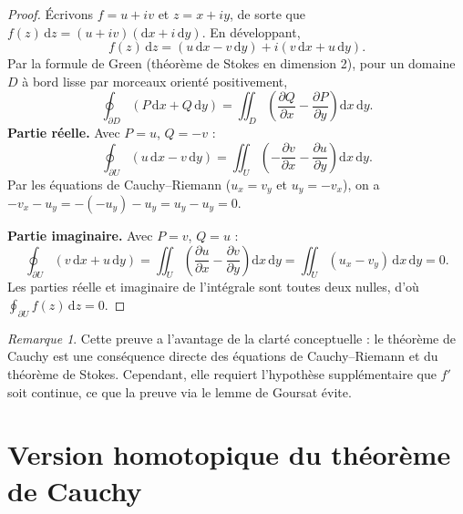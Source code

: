 \documentclass[12pt,a4paper,openany]{book}
\theoremstyle{definition}
\theoremstyle{plain}
\theoremstyle{remark}
\newtheorem{remarque}[definition]{Remarque}
\newcommand{\dd}{\mathrm{d}}
\begin{document}
\begin{proof}
Écrivons $f = u + iv$ et $z = x + iy$, de sorte que
$f(z)\,\dd z = (u+iv)(\dd x + i\,\dd y)$. En développant,
\[
  f(z)\,\dd z = (u\,\dd x - v\,\dd y) + i(v\,\dd x + u\,\dd y).
\]
Par la formule de Green (théorème de Stokes en dimension 2), pour un domaine
$D$ à bord lisse par morceaux orienté positivement,
\[
  \oint_{\partial D} (P\,\dd x + Q\,\dd y)
  = \iint_D \left(\frac{\partial Q}{\partial x}
    - \frac{\partial P}{\partial y}\right) \dd x\,\dd y.
\]
\textbf{Partie réelle.} Avec $P = u$, $Q = -v$ :
\[
  \oint_{\partial U} (u\,\dd x - v\,\dd y)
  = \iint_U \left(-\frac{\partial v}{\partial x}
    - \frac{\partial u}{\partial y}\right) \dd x\,\dd y.
\]
Par les équations de Cauchy--Riemann ($u_x = v_y$ et $u_y = -v_x$), on a
$-v_x - u_y = -(-u_y) - u_y = u_y - u_y = 0$.

\textbf{Partie imaginaire.} Avec $P = v$, $Q = u$ :
\[
  \oint_{\partial U} (v\,\dd x + u\,\dd y)
  = \iint_U \left(\frac{\partial u}{\partial x}
    - \frac{\partial v}{\partial y}\right) \dd x\,\dd y
  = \iint_U (u_x - v_y)\,\dd x\,\dd y = 0.
\]
Les parties réelle et imaginaire de l'intégrale sont toutes deux nulles, d'où
$\oint_{\partial U} f(z)\,\dd z = 0$.
\end{proof}

\begin{remarque}\label{rem:green-hypothese}
Cette preuve a l'avantage de la clarté conceptuelle : le théorème de Cauchy
est une conséquence directe des équations de Cauchy--Riemann et du théorème
de Stokes. Cependant, elle requiert l'hypothèse supplémentaire que $f'$ soit
continue, ce que la preuve via le lemme de Goursat évite.
\end{remarque}

\section{Version homotopique du théorème de Cauchy}\label{sec:cauchy-homotopie}
\end{document}
